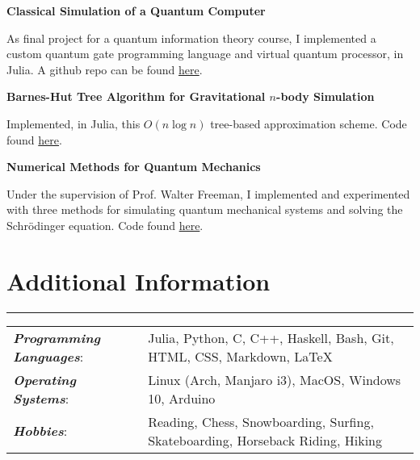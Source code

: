 \documentclass{article}
\newcommand{\myline}{\rule[\baselineskip]{\linewidth}{1pt}}
\begin{document}
\vspace{2.5pt}
\large\textbf{Classical Simulation of a Quantum Computer}
\normalsize

\begin{compactitem}
\item As final project for a quantum information theory course, I implemented a custom quantum gate programming language and virtual quantum processor, in Julia. A github repo can be found \href{https://github.com/aarontrowbridge/QuIPS}{here}.
\end{compactitem}


\vspace{2.5pt}
\large\textbf{Barnes-Hut Tree Algorithm for Gravitational $n$-body Simulation}
\normalsize

\begin{compactitem}
\item Implemented, in Julia, this $O(n \log n)$ tree-based approximation scheme. Code found \href{https://github.com/aarontrowbridge/Gravity}{here}. 
\end{compactitem}


\vspace{2.5pt}
\large\textbf{Numerical Methods for Quantum Mechanics}
\normalsize

\begin{compactitem}
\item Under the supervision of Prof. Walter Freeman, I implemented and experimented with three methods for simulating quantum mechanical systems and solving the Schr\"odinger equation. Code found \href{https://github.com/aarontrowbridge/Quantum}{here}. 
\end{compactitem}



\section{Additional Information}
\myline

\normalsize

\begin{tabular}{ll}
\textbf{\textit{Programming Languages}}: & Julia, Python, C, C++,  Haskell, Bash, Git, HTML, CSS, Markdown, \LaTeX \\
\textbf{\textit{Operating Systems}}: & Linux (Arch, Manjaro i3), MacOS, Windows 10, Arduino \\ 
\textbf{\textit{Hobbies}}: & Reading, Chess, Snowboarding, Surfing, Skateboarding, Horseback Riding, Hiking \\    
\end{tabular}
\end{document}
